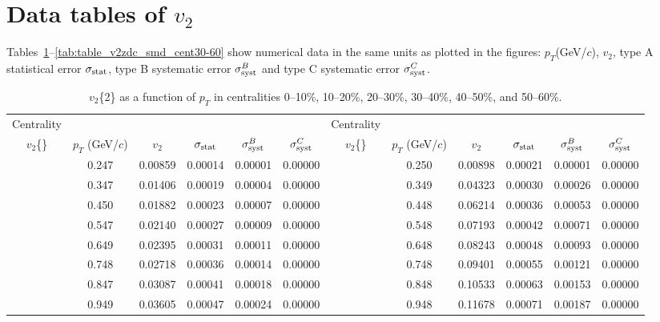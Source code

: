 \documentclass[aps,prc,superscriptaddress,showpacs,floatfix,twocolumn]{revtex4}
\newcommand \gevc{GeV/$c$\xspace}
\newcommand \pt{\mbox{$p_T$}\xspace}
\begin{document}
\appendix*

\section{Data tables of $v_2$}

Tables~\ref{tab:table_v2cumulant_cent0-30}--\ref{tab:table_v2zdc_smd_cent30-60} 
show numerical data in the same units as plotted in the figures: 
\pt (GeV/$c$), $v_2$, type A statistical error $\sigma_{\rm 
stat}$, type B systematic error $\sigma_{\rm syst}^B$ and type C 
systematic error $\sigma_{\rm syst}^C$.

\begin{table}[htbp]
\caption{\label{tab:table_v2cumulant_cent0-30}
 $v_2$\{2\} as a function of \pt in centralities 
0--10\%, 10--20\%, 20--30\%, 30--40\%, 40--50\%, and 50--60\%.
}
\begingroup \squeezetable
\begin{ruledtabular} \begin{tabular}{c|ccccc||c|ccccc}
Centrality & & & & & & Centrality & & & & & \\
$v_2$\{\} & $\pt$ (\gevc) & $v_2$ & $\sigma_{\rm stat}$ & $\sigma_{\rm syst}^B$ & $\sigma_{\rm syst}^C$ &
$v_2$\{\} & $\pt$ (\gevc) & $v_2$ & $\sigma_{\rm stat}$ & $\sigma_{\rm syst}^B$ & $\sigma_{\rm syst}^C$ \\ 
\hline
 & 0.247 & 0.00859 & 0.00014 & 0.00001   &  0.00000 &  & 0.250 & 0.00898   & 0.00021 &  0.00001  & 0.00000 \\
 & 0.347 & 0.01406 & 0.00019 & 0.00004   &  0.00000 &  & 0.349 & 0.04323   & 0.00030 &  0.00026  & 0.00000 \\
 & 0.450 & 0.01882 & 0.00023 & 0.00007   &  0.00000 &  & 0.448 & 0.06214   & 0.00036 &  0.00053  & 0.00000 \\
 & 0.547 & 0.02140 & 0.00027 & 0.00009   &  0.00000 &  & 0.548 & 0.07193   & 0.00042 &  0.00071  & 0.00000 \\
 & 0.649 & 0.02395 & 0.00031 & 0.00011   &  0.00000 &  & 0.648 & 0.08243   & 0.00048 &  0.00093  & 0.00000 \\
 & 0.748 & 0.02718 & 0.00036 & 0.00014   &  0.00000 &  & 0.748 & 0.09401   & 0.00055 &  0.00121  & 0.00000 \\
 & 0.847 & 0.03087 & 0.00041 & 0.00018   &  0.00000 &  & 0.848 & 0.10533   & 0.00063 &  0.00153  & 0.00000 \\
 & 0.949 & 0.03605 & 0.00047 & 0.00024   &  0.00000 &  & 0.948 & 0.11678   & 0.00071 &  0.00187  & 0.00000 \\

\end{tabular}
\end{ruledtabular}
\end{table}
\end{document}
